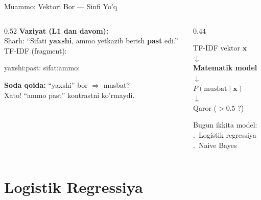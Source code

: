\documentclass[aspectratio=169,11pt]{beamer}
\begin{document}
\begin{frame}{Muammo: Vektori Bor --- Sinfi Yo'q}
  \begin{columns}[T]
    \begin{column}{0.52\textwidth}
      \small
      \textbf{Vaziyat (L1 dan davom):}\\[4pt]
      Sharh: ``Sifati \textbf{yaxshi}, ammo
      yetkazib berish \textbf{past} edi.''\\[5pt]
      TF-IDF (fragment):\\[2pt]
      \begin{tcolorbox}[warnbox]
        \footnotesize
        yaxshi:\quad past:\quad
        sifat:\quad ammo:
      \end{tcolorbox}
      \vspace{5pt}
      \textbf{Soda qoida:} ``yaxshi'' bor $\Rightarrow$ musbat?\\
      \alert{Xato!} ``ammo past'' kontrastni ko'rmaydi.
    \end{column}
    \begin{column}{0.44\textwidth}
      \vspace{8pt}
      \begin{tcolorbox}[defbox,title=NLP yondashuvi]
        \small
        TF-IDF vektor $\mathbf{x}$\\[2pt]
        $\downarrow$\\[2pt]
        \textbf{Matematik model}\\[2pt]
        $\downarrow$\\[2pt]
        $P(\text{musbat}\mid\mathbf{x})$\\[2pt]
        $\downarrow$\\[2pt]
        Qaror ($>\!0.5$ ?)
      \end{tcolorbox}
      \vspace{5pt}
      \small Bugun ikkita model:\\
      .\ Logistik regressiya\\
      .\ Naive Bayes
    \end{column}
  \end{columns}
\end{frame}

\section[Log.\ Reg.]{Logistik Regressiya}
\end{document}
